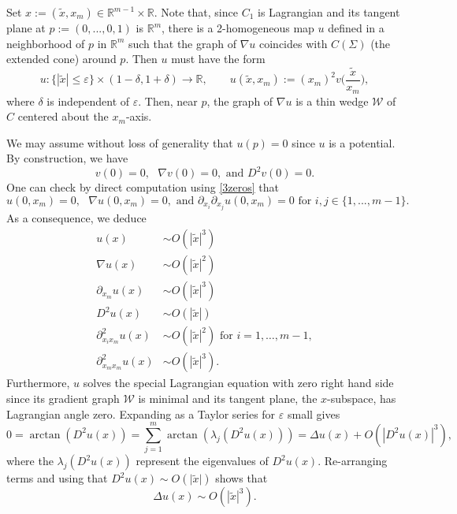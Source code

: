 \documentclass[11pt]{amsart}
\theoremstyle{definition}
\theoremstyle{remark}
\newcommand{\R}{\mathbb{R}}
\begin{document}
Set $x := (\tilde{x}, x_m) \in \R^{m-1} \times \R$.
Note that, since $C_1$ is Lagrangian and its tangent plane at $p:=(0,...,0,1)$ is $\mathbb{R}^m$, there is a 2-homogeneous map $u$ defined in a neighborhood of $p$ in $\mathbb{R}^m$ such that the graph of $\nabla u$ coincides with $C(\Sigma)$ (the extended cone) around $p$. Then $u$ must have the form 
\begin{equation*}
    u: \{|\tilde{x}| \leq \varepsilon\} \times (1-\delta, 1+ \delta) \rightarrow \R, \qquad u(\tilde{x}, x_m) := (x_m)^2 v\Big(\frac{\tilde{x}}{{x_m}}\Big),
\end{equation*}
where $\delta$ is independent of $\varepsilon$. Then, near $p$, the graph of $\nabla u$ is a thin wedge $\mathscr{W}$ of $C$ centered about the $x_m$-axis.

We may assume without loss of generality that $u(p) = 0$ since $u$ is a potential. By construction, we have
\begin{equation}
    v(0) = 0, \text{ } \nabla v(0) = 0, \text{ and } D^2 v(0) = 0. \label{3zeros}
\end{equation}
One can check by direct computation using \eqref{3zeros} that 
\begin{equation*}
    u(0,x_m) = 0, \text{ } 
    \nabla  u(0, x_m) = 0, \text{ and } \partial_{x_i}\partial_{x_j}u(0,x_m)=0 \text{ for } i,j\in \{1,...,m-1\}.
\end{equation*}
As a consequence, we deduce
\begin{align*}
    u(x) &\sim O(|\tilde{x}|^3) \\
    \nabla u(x) &\sim O(|\tilde{x}|^2) \\
    \partial_{x_m} u(x) &\sim O(|\tilde{x}|^3)\\
    D^2 u(x) &\sim O(|\tilde{x}|) \\
    \partial_{x_i x_m}^2 u(x) &\sim O(|\tilde{x}|^2) \text{ for } i = 1,\ldots, m-1, \\ 
    \partial_{x_m x_m}^2 u(x) &\sim O(|\tilde{x}|^3).
\end{align*}
Furthermore, $u$ solves the special Lagrangian equation with zero right hand side since its gradient graph $\mathscr{W}$ is minimal and its tangent plane, the $x$-subspace, has Lagrangian angle zero. Expanding as a Taylor series for $\varepsilon$ small gives
\[0 = \arctan(D^2u(x)) = \sum_{j = 1}^m \arctan(\lambda_j(D^2u(x))) =  \Delta u(x) + O(|D^2 u(x)|^3),\]
where the $\lambda_j(D^2u(x))$ represent the eigenvalues of $D^2 u(x)$. Re-arranging terms and using that $D^2u(x)\sim O(\lvert\tilde x\rvert)$ shows that
\[\Delta u(x) \sim O(|\tilde{x}|^3).\]
\end{document}
